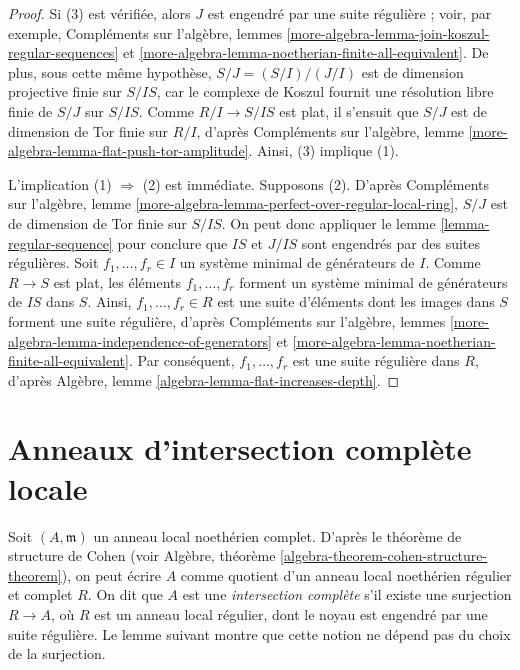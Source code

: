 \begin{proof}
Si (3) est vérifiée, alors $J$ est engendré par une suite régulière ; voir, par exemple,
Compléments sur l'algèbre, lemmes
\ref{more-algebra-lemma-join-koszul-regular-sequences} et
\ref{more-algebra-lemma-noetherian-finite-all-equivalent}. De
plus, sous cette même hypothèse, $S/J = (S/I)/(J/I)$
est de dimension projective finie sur $S/IS$, car le complexe
de Koszul fournit une résolution libre finie de $S/J$ sur $S/IS$.
Comme $R/I \to S/IS$ est plat, il s'ensuit que $S/J$ est de
dimension de Tor finie sur $R/I$,
d'après Compléments sur l'algèbre, lemme \ref{more-algebra-lemma-flat-push-tor-amplitude}.
Ainsi, (3) implique (1).

\medskip\noindent
L'implication (1) $\Rightarrow$ (2) est immédiate.
Supposons (2). D'après
Compléments sur l'algèbre, lemme \ref{more-algebra-lemma-perfect-over-regular-local-ring},
$S/J$ est de dimension de Tor finie sur $S/IS$.
On peut donc appliquer le lemme \ref{lemma-regular-sequence}
pour conclure que $IS$ et $J/IS$ sont engendrés par des suites régulières.
Soit $f_1, \ldots, f_r \in I$ un système minimal de générateurs de $I$.
Comme $R \to S$ est plat, les éléments $f_1, \ldots, f_r$ forment un
système minimal de générateurs de $IS$ dans $S$. Ainsi, $f_1, \ldots, f_r \in R$
est une suite d'éléments dont les images dans $S$ forment une suite régulière,
d'après Compléments sur l'algèbre, lemmes
\ref{more-algebra-lemma-independence-of-generators} et
\ref{more-algebra-lemma-noetherian-finite-all-equivalent}. Par
conséquent, $f_1, \ldots, f_r$ est une suite régulière dans $R$,
d'après Algèbre, lemme \ref{algebra-lemma-flat-increases-depth}.
\end{proof}





\section{Anneaux d'intersection complète locale}
\label{section-lci}

\noindent
Soit $(A, \mathfrak m)$ un anneau local noethérien complet.
D'après le théorème de structure de Cohen (voir
Algèbre, théorème \ref{algebra-theorem-cohen-structure-theorem}),
on peut écrire $A$ comme quotient d'un anneau local
noethérien régulier et complet $R$. On dit que $A$ est une
{\it intersection
complète} s'il existe une surjection $R \to A$,
où $R$ est un anneau local régulier, dont le
noyau est engendré par une suite
régulière. Le lemme suivant montre que cette notion ne dépend
pas du choix de la surjection.

